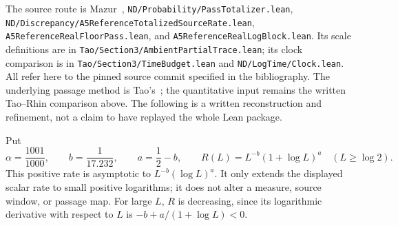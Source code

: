 The source route is Mazur~\cite{Mazur2026v2},
\texttt{ND/Probability/PassTotalizer.lean},
\texttt{ND/Discrepancy/A5ReferenceTotalizedSourceRate.lean},
\texttt{A5ReferenceRealFloorPass.lean}, and
\texttt{A5ReferenceRealLogBlock.lean}. Its scale definitions are in
\texttt{Tao/Section3/AmbientPartialTrace.lean}; its clock comparison is
in \texttt{Tao/Section3/TimeBudget.lean} and
\texttt{ND/LogTime/Clock.lean}. All refer here to the pinned source
commit specified in the bibliography. The underlying passage method
is Tao's~\cite{Tao2026v7}; the quantitative input remains the written
Tao--Rhin comparison above. The following is a written reconstruction
and refinement, not a claim to have replayed the whole Lean package.

Put
\[
 \alpha=\frac{1001}{1000},\qquad b=\frac1{17.232},\qquad
 a=\frac12-b,\qquad
 R(L)=L^{-b}(1+\log L)^a\quad(L\ge\log2).
\]
This positive rate is asymptotic to \(L^{-b}(\log L)^a\).
It only extends the displayed scalar rate to small positive logarithms;
it does not alter a measure, source window, or passage map.
For large \(L\), \(R\) is decreasing, since its logarithmic derivative
with respect to \(L\) is \(-b+a/(1+\log L)<0\).

